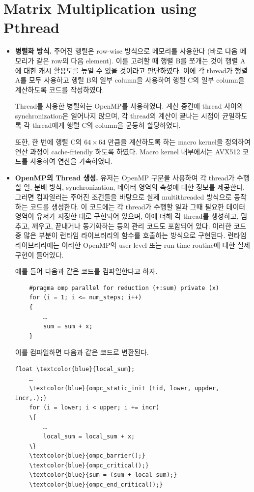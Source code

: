 \section{Matrix Multiplication using Pthread}

\begin{itemize}

    \item {
        \textbf{병렬화 방식.}
        주어진 행렬은 row-wise 방식으로 메모리를 사용한다 (바로 다음 메모리가 같은 row의 다음 element).
        이를 고려할 때 행렬 B를 쪼개는 것이 행렬 A에 대한 캐시 활용도를 높일 수 있을 것이라고 판단하였다.
        이에 각 thread가 행렬 A를 모두 사용하고 행렬 B의 일부 column을 사용하여 행렬 C의 일부 column을
        계산하도록 코드를 작성하였다.

        Thread를 사용한 병렬화는 OpenMP를 사용하였다.
        계산 중간에 thread 사이의 synchronization은 일어나지 않으며, 각 thread의 계산이 끝나는
        시점이 균일하도록 각 thread에게 행렬 C의 column을 균등히 할당하였다.
        
        또한, 한 번에 행렬 C의 $64 \times 64$ 만큼을 계산하도록 하는 macro kernel을 정의하여
        연산 과정이 cache-friendly 하도록 하였다. Macro kernel 내부에서는 AVX512 코드를 사용하여
        연산을 가속하였다.
    }
    \item {
        \textbf{OpenMP의 Thread 생성.}
        유저는 OpenMP 구문을 사용하여 각 thread가 수행할 일, 분배 방식, synchronization,
        데이터 영역의 속성에 대한 정보를 제공한다. 그러면 컴파일러는 주어진 조건들을 바탕으로
        실제 multithreaded 방식으로 동작하는 코드를 생성한다.
        이 코드에는 각 thread가 수행할 일과 그때 필요한 데이터 영역이 유저가 지정한 대로 구현되어 있으며,
        이에 더해 각 thread를 생성하고, 멈추고, 깨우고, 끝내거나 동기화하는 등의 관리 코드도 포함되어 있다.
        이러한 코드 중 많은 부분이 런타임 라이브러리의 함수를 호출하는 방식으로 구현된다.
        런타임 라이브러리에는 이러한 OpenMP의 user-level 또는 run-time routine에 대한 실제 구현이 들어있다.

        예를 들어 다음과 같은 코드를 컴파일한다고 하자.

        \begin{verbatim}
    #pragma omp parallel for reduction (+:sum) private (x)
    for (i = 1; i <= num_steps; i++)
    { 
        …
        sum = sum + x;
    }
        \end{verbatim}

        이를 컴파일하면 다음과 같은 코드로 변환된다.
        \begin{Verbatim}[commandchars=\\\{\}]
    float \textcolor{blue}{local_sum};
    …
    \textcolor{blue}{ompc_static_init (tid, lower, uppder, incr,.);}
    for (i = lower; i < upper; i += incr)
    \{ 
        …
        local_sum = local_sum + x;
    \}
    \textcolor{blue}{ompc_barrier();}
    \textcolor{blue}{ompc_critical();}
    \textcolor{blue}{sum = (sum + local_sum);}
    \textcolor{blue}{ompc_end_critical();}
        \end{Verbatim}
        
}
\end{itemize}
